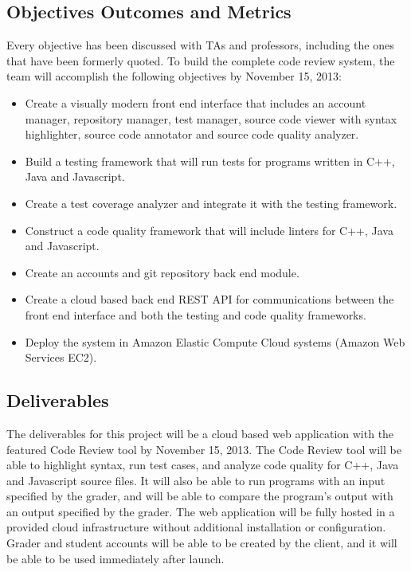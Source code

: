 
\subsection{Objectives Outcomes and Metrics}

Every objective has been discussed with TAs and professors, including the ones
that have been formerly quoted. To build the complete code review system, the
team will accomplish the following objectives by November 15, 2013:

\begin{itemize}
\item Create a visually modern front end interface that includes an account
manager, repository manager, test manager, source code viewer with syntax
highlighter, source code annotator and source code quality analyzer.

\item Build a testing framework that will run tests for programs written in C++,
Java and Javascript.

\item Create a test coverage analyzer and integrate it with the testing
framework.

\item Construct a code quality framework that will include linters for C++, Java
and Javascript.

\item Create an accounts and git repository back end module.

\item Create a cloud based back end REST API for communications between the
front end interface and both the testing and code quality frameworks.

\item Deploy the system in Amazon Elastic Compute Cloud systems (Amazon Web
Services EC2).

\end{itemize}
\subsection{Deliverables}

The deliverables for this project will be a cloud based web application with the
featured Code Review tool by November 15, 2013. The Code Review tool will be
able to highlight syntax, run test cases, and analyze code quality for C++, Java
and Javascript source files. It will also be able to run programs with an input
specified by the grader, and will be able to compare the program's output with
an output specified by the grader. The web application will be fully hosted in a
provided cloud infrastructure without additional installation or configuration.
Grader and student accounts will be able to be created by the client, and it
will be able to be used immediately after launch.

